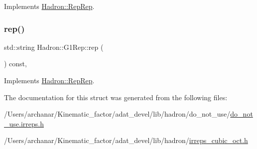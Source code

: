 Implements \mbox{\hyperlink{structHadron_1_1RepRep_ab3213025f6de249f7095892109575fde}{Hadron\+::\+Rep\+Rep}}.

\mbox{\label{structHadron_1_1G1Rep_a2da49f8741322aebd7903da15cb9b751}} 
\subsubsection{\texorpdfstring{rep()}{rep()}\hspace{0.1cm}{\footnotesize\ttfamily [3/3]}}
{\footnotesize\ttfamily std\+::string Hadron\+::\+G1\+Rep\+::rep (\begin{DoxyParamCaption}{ }\end{DoxyParamCaption}) const\hspace{0.3cm}{\ttfamily [inline]}, {\ttfamily [virtual]}}



Implements \mbox{\hyperlink{structHadron_1_1RepRep_ab3213025f6de249f7095892109575fde}{Hadron\+::\+Rep\+Rep}}.



The documentation for this struct was generated from the following files\+:\begin{DoxyCompactItemize}
\item 
/\+Users/archanar/\+Kinematic\+\_\+factor/adat\+\_\+devel/lib/hadron/do\+\_\+not\+\_\+use/\mbox{\hyperlink{do__not__use_8irreps_8h}{do\+\_\+not\+\_\+use.\+irreps.\+h}}\item 
/\+Users/archanar/\+Kinematic\+\_\+factor/adat\+\_\+devel/lib/hadron/\mbox{\hyperlink{lib_2hadron_2irreps__cubic__oct_8h}{irreps\+\_\+cubic\+\_\+oct.\+h}}\end{DoxyCompactItemize}
